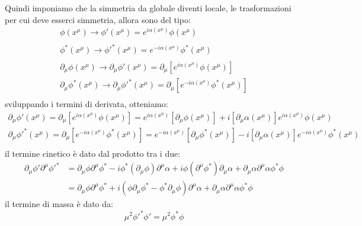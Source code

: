 Quindi imponiamo che la simmetria da globale diventi locale, le trasformazioni per cui deve esserci simmetria, allora sono del tipo:
\begin{equation}
\begin{gathered}
    \phi(x^\mu)\xrightarrow[\text{}]{\text{}} \phi'(x^\mu)=e^{i\alpha(x^\mu)}\phi(x^\mu)\\
    \phi^*(x^\mu)\xrightarrow[\text{}]{\text{}}\phi'^*(x^\mu)=e^{-i\alpha(x^\mu)}\phi^*(x^\mu)\\
    \partial_\mu \phi(x^\mu)\xrightarrow[\text{}]{\text{}}\partial_\mu \phi'(x^\mu)=\partial_\mu[e^{i\alpha(x^\mu)}\phi(x^\mu)]\\
   \partial_\mu \phi^*(x^\mu)\xrightarrow[\text{}]{\text{}} \partial_\mu \phi'^*(x^\mu)=\partial_\mu[e^{-i\alpha(x^\mu)}\phi^*(x^\mu)]\\
\end{gathered}
\end{equation}
sviluppando i termini di derivata, otteniamo:
\begin{equation}
\begin{gathered}
    \partial_\mu \phi'(x^\mu)=\partial_\mu[e^{i\alpha(x^\mu)}\phi(x^\mu)]=e^{i\alpha(x^\mu)}[\partial_\mu\phi(x^\mu)]+i[\partial_\mu\alpha(x^\mu)]e^{i\alpha(x^\mu)}\phi(x^\mu)\\
  \partial_\mu \phi'^*(x^\mu)=\partial_\mu[e^{-i\alpha(x^\mu)}\phi^*(x^\mu)]=e^{-i\alpha(x^\mu)}[\partial_\mu\phi^*(x^\mu)]-i[\partial_\mu\alpha(x^\mu)]e^{-i\alpha(x^\mu)}\phi^*(x^\mu)\\
\end{gathered}
\end{equation}
il termine cinetico è dato dal prodotto tra i due:
\begin{equation}
\begin{aligned}
      \partial_\mu \phi'\partial^\mu \phi'^*&= \partial_\mu \phi\partial^\mu \phi^*-i\phi^*(\partial_\mu\phi)\partial^\mu\alpha+i\phi(\partial^\mu\phi^*)\partial_\mu\alpha+\partial_\mu\alpha\partial^\mu\alpha\phi^*\phi\\
      &=\partial_\mu \phi\partial^\mu \phi^*+i(\phi\partial_\mu\phi^*-\phi^*\partial_\mu\phi)\partial^\mu\alpha+\partial_\mu\alpha\partial^\mu\alpha\phi^*\phi
\end{aligned}
\end{equation}
il termine di massa è dato da:
\begin{equation}
\mu^2\phi'^*\phi'=\mu^2\phi^*\phi
\end{equation}


